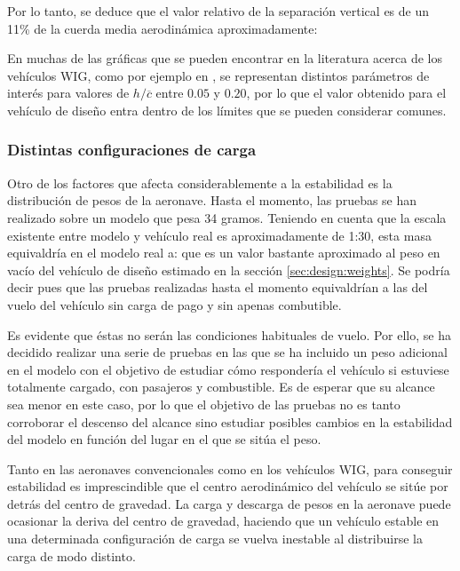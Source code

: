 Por lo tanto, se deduce que el valor relativo de la separación vertical es de un 11\% de la cuerda media aerodinámica aproximadamente:

En muchas de las gráficas que se pueden encontrar en la literatura acerca de los vehículos WIG, como por ejemplo en \cite{ref:wigpaper}, se representan distintos parámetros de interés para valores de $h/\overline{c}$ entre $0.05$ y $0.20$, por lo que el valor obtenido para el vehículo de diseño entra dentro de los límites que se pueden considerar comunes.



\subsubsection{Distintas configuraciones de carga}
\label{sec:tests:results:weights}

Otro de los factores que afecta considerablemente a la estabilidad es la distribución de pesos de la aeronave. Hasta el momento, las pruebas se han realizado sobre un modelo que pesa 34 gramos. Teniendo en cuenta que la escala existente entre modelo y vehículo real es aproximadamente de 1:30, esta masa equivaldría en el modelo real a:
que es un valor bastante aproximado al peso en vacío del vehículo de diseño estimado en la sección \ref{sec:design:weights}. Se podría decir pues que las pruebas realizadas hasta el momento equivaldrían a las del vuelo del vehículo sin carga de pago y sin apenas combutible.

Es evidente que éstas no serán las condiciones habituales de vuelo. Por ello, se ha decidido realizar una serie de pruebas en las que se ha incluido un peso adicional en el modelo con el objetivo de estudiar cómo respondería el vehículo si estuviese totalmente cargado, con pasajeros y combustible. Es de esperar que su alcance sea menor en este caso, por lo que el objetivo de las pruebas no es tanto corroborar el descenso del alcance sino estudiar posibles cambios en la estabilidad del modelo en función del lugar en el que se sitúa el peso.

Tanto en las aeronaves convencionales como en los vehículos WIG, para conseguir estabilidad es imprescindible que el centro aerodinámico del vehículo se sitúe por detrás del centro de gravedad. La carga y descarga de pesos en la aeronave puede ocasionar la deriva del centro de gravedad, haciendo que un vehículo estable en una determinada configuración de carga se vuelva inestable al distribuirse la carga de modo distinto.

